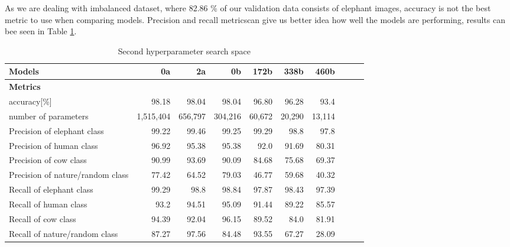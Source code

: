 
As we are dealing with imbalanced dataset, where 82.86 \% of our validation data consists of elephant images, accuracy is not the best metric to use when comparing models.
Precision and recall metrics\footnotemark can give us better idea how well the models are performing, results can bee seen in Table \ref{precision_recall_table}.


\begin{table}
    \centering
    \caption{ Second hyperparameter search space}
    \begin{tabular}{ lrrrrrrrrr}\toprule
        \textbf{Models}                 & 0a & 2a & 0b & 172b & 338b & 460b\\\toprule
        \textbf{Metrics}                &&&&&\\\toprule
        accuracy[\%]                    & 98.18     & 98.04   & 98.04   & 96.80  & 96.28  & 93.4  \\
        number of parameters            & 1,515,404 & 656,797 & 304,216 & 60,672 & 20,290 & 13,114\\ 
        Precision of elephant class     & 99.22     & 99.46   & 99.25   & 99.29  & 98.8   & 97.8 \\
        Precision of human class        & 96.92     & 95.38   & 95.38   & 92.0   & 91.69  & 80.31\\
        Precision of cow class          & 90.99     & 93.69   & 90.09   & 84.68  & 75.68  & 69.37\\
        Precision of nature/random class& 77.42     & 64.52   & 79.03   & 46.77  & 59.68  & 40.32\\
        Recall of elephant class        & 99.29     & 98.8    & 98.84   & 97.87  & 98.43  & 97.39\\
        Recall of human class           & 93.2      & 94.51   & 95.09   & 91.44  & 89.22  & 85.57\\
        Recall of cow class             & 94.39     & 92.04   & 96.15   & 89.52  & 84.0   & 81.91\\
        Recall of nature/random class   & 87.27     & 97.56   & 84.48   & 93.55  & 67.27  & 28.09\\\bottomrule
    \end{tabular}
    \label{precision_recall_table}
\end{table}


